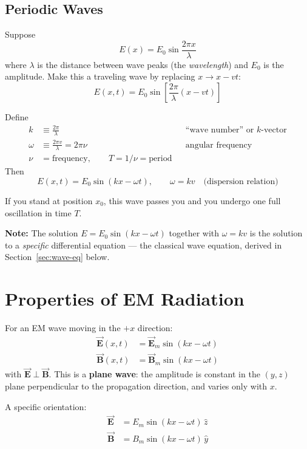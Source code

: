 \documentclass[11pt]{report}
\newcommand{\vbf}[1]{\vec{\mathbf{#1}}}
\begin{document}
\subsection{Periodic Waves}

Suppose
\begin{equation}
E(x) = E_0 \sin\frac{2\pi x}{\lambda}
\end{equation}
where $\lambda$ is the distance between wave peaks (the \emph{wavelength}) and $E_0$ is the amplitude. Make this a traveling wave by replacing $x \to x - vt$:
\begin{equation}
E(x,t) = E_0 \sin\!\left[\frac{2\pi}{\lambda}(x - vt)\right]
\end{equation}

Define
\begin{align}
k &\equiv \frac{2\pi}{\lambda} && \text{``wave number'' or $k$-vector} \\
\omega &\equiv \frac{2\pi v}{\lambda} = 2\pi\nu && \text{angular frequency} \\
\nu &= \text{frequency}, \qquad T = 1/\nu = \text{period}
\end{align}
Then
\begin{equation}
\boxed{E(x,t) = E_0 \sin(kx - \omega t), \qquad \omega = kv \quad \text{(dispersion relation)}}
\end{equation}

If you stand at position $x_0$, this wave passes you and you undergo one full oscillation in time $T$.

\textbf{Note:} The solution $E = E_0\sin(kx - \omega t)$ together with $\omega = kv$ is the solution to a \emph{specific} differential equation --- the classical wave equation, derived in Section~\ref{sec:wave-eq} below.

\section{Properties of EM Radiation}

For an EM wave moving in the $+x$ direction:
\begin{align}
\vbf{E}(x,t) &= \vbf{E}_m \sin(kx - \omega t) \\
\vbf{B}(x,t) &= \vbf{B}_m \sin(kx - \omega t)
\end{align}
with $\vbf{E}\perp\vbf{B}$. This is a \textbf{plane wave}: the amplitude is constant in the $(y,z)$ plane perpendicular to the propagation direction, and varies only with $x$.

A specific orientation:
\begin{align}
\vbf{E} &= E_m \sin(kx - \omega t)\,\hat{z} \\
\vbf{B} &= B_m \sin(kx - \omega t)\,\hat{y}
\end{align}
\end{document}
